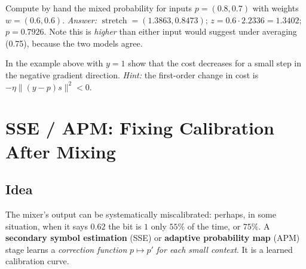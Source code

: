 \documentclass[11pt,a4paper,openany]{book}
\newcommand{\st}{\operatorname{stretch}}
\theoremstyle{definition}
\theoremstyle{remark}
\begin{document}
\begin{center}
\end{center}

\begin{exercise}
Compute by hand the mixed probability for inputs $p=(0.8,0.7)$ with weights $w=(0.6,0.6)$. \emph{Answer:} $\st=(1.3863,0.8473)$; $z=0.6\cdot2.2336=1.3402$; $p=0.7926$. Note this is \emph{higher} than either input would suggest under averaging (0.75), because the two models agree.
\end{exercise}

\begin{exercise}
In the example above with $y=1$ show that the cost decreases for a small step in the negative gradient direction. \emph{Hint:} the first-order change in cost is $-\eta\|(y-p)s\|^2<0$.
\end{exercise}


\chapter{SSE / APM: Fixing Calibration After Mixing}

\section{Idea}

The mixer's output can be systematically miscalibrated: perhaps, in some situation, when it says $0.62$ the bit is $1$ only $55\%$ of the time, or $75\%$. A \textbf{secondary symbol estimation} (SSE) or \textbf{adaptive probability map} (APM) stage learns a \emph{correction function} $p\mapsto p'$ \emph{for each small context}. It is a learned calibration curve.
\end{document}
